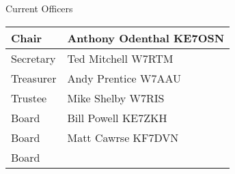 \documentclass[letter,11pt]{extarticle}
\begin{document}

	Current Officers \\
	\begin{tabular}{|l|l|} \hline
		Chair & Anthony Odenthal KE7OSN \\ \hline
		Secretary & Ted Mitchell W7RTM \\ \hline
		Treasurer & Andy Prentice W7AAU \\ \hline
		Trustee & Mike Shelby W7RIS   \\ \hline
		Board & Bill Powell KE7ZKH \\ \hline
		Board & Matt Cawrse KF7DVN \\ \hline
		Board & \\ \hline
	\end{tabular}
	
	\subsection*{}
	
\end{document}
